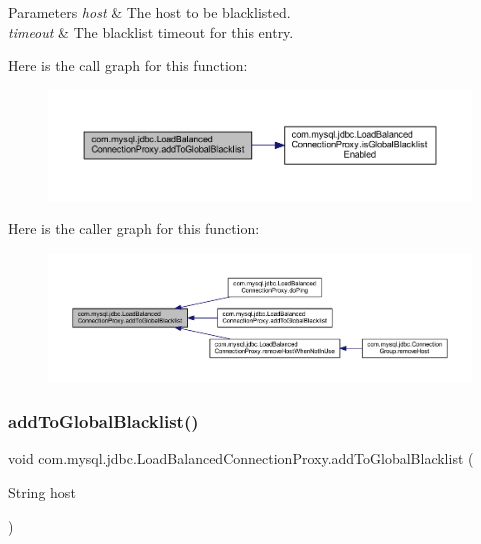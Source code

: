 \begin{DoxyParams}{Parameters}
{\em host} & The host to be blacklisted. \\
\hline
{\em timeout} & The blacklist timeout for this entry. \\
\hline
\end{DoxyParams}
Here is the call graph for this function\+:
\nopagebreak
\begin{figure}[H]
\begin{center}
\leavevmode
\includegraphics[width=350pt]{classcom_1_1mysql_1_1jdbc_1_1_load_balanced_connection_proxy_a93dad34c094b301be7cb59b0fe7c01da_cgraph}
\end{center}
\end{figure}
Here is the caller graph for this function\+:
\nopagebreak
\begin{figure}[H]
\begin{center}
\leavevmode
\includegraphics[width=350pt]{classcom_1_1mysql_1_1jdbc_1_1_load_balanced_connection_proxy_a93dad34c094b301be7cb59b0fe7c01da_icgraph}
\end{center}
\end{figure}
\mbox{\label{classcom_1_1mysql_1_1jdbc_1_1_load_balanced_connection_proxy_a9b1718c334191c26cb1befc847cd8aad}} 
\subsubsection{\texorpdfstring{add\+To\+Global\+Blacklist()}{addToGlobalBlacklist()}\hspace{0.1cm}{\footnotesize\ttfamily [2/2]}}
{\footnotesize\ttfamily void com.\+mysql.\+jdbc.\+Load\+Balanced\+Connection\+Proxy.\+add\+To\+Global\+Blacklist (\begin{DoxyParamCaption}\item[{String}]{host }\end{DoxyParamCaption})}

